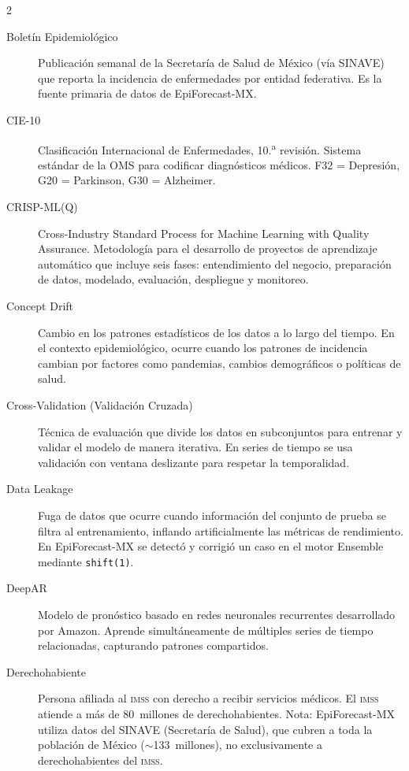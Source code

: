 \documentclass[12pt, letterpaper]{article}
\newcommand{\imss}{\textnormal{\textsc{imss}}}
\begin{document}
\begin{multicols}{2}
\small
\setlength{\emergencystretch}{3em}
\begin{description}

\item[Boletín Epidemiológico]
Publicación semanal de la Secretaría de Salud de México (vía SINAVE) que reporta la incidencia de enfermedades por entidad federativa. Es la fuente primaria de datos de EpiForecast-MX.

\item[CIE-10]
Clasificación Internacional de Enfermedades, 10.\textsuperscript{a} revisión. Sistema estándar de la OMS para codificar diagnósticos médicos. F32 = Depresión, G20 = Parkinson, G30 = Alzheimer.

\item[CRISP-ML(Q)]
Cross-Industry Standard Process for Machine Learning with Quality Assurance. Metodología para el desarrollo de proyectos de aprendizaje automático que incluye seis fases: entendimiento del negocio, preparación de datos, modelado, evaluación, despliegue y monitoreo.

\item[Concept Drift]
Cambio en los patrones estadísticos de los datos a lo largo del tiempo. En el contexto epidemiológico, ocurre cuando los patrones de incidencia cambian por factores como pandemias, cambios demográficos o políticas de salud.

\item[Cross-Validation (Validación Cruzada)]
Técnica de evaluación que divide los datos en subconjuntos para entrenar y validar el modelo de manera iterativa. En series de tiempo se usa validación con ventana deslizante para respetar la temporalidad.

\item[Data Leakage]
Fuga de datos que ocurre cuando información del conjunto de prueba se filtra al entrenamiento, inflando artificialmente las métricas de rendimiento. En EpiForecast-MX se detectó y corrigió un caso en el motor Ensemble mediante \texttt{shift(1)}.

\item[DeepAR]
Modelo de pronóstico basado en redes neuronales recurrentes desarrollado por Amazon. Aprende simultáneamente de múltiples series de tiempo relacionadas, capturando patrones compartidos.

\item[Derechohabiente]
Persona afiliada al \imss{} con derecho a recibir servicios médicos. El \imss{} atiende a más de 80~millones de derechohabientes. Nota: EpiForecast-MX utiliza datos del SINAVE (Secretaría de Salud), que cubren a toda la población de México ($\sim$133~millones), no exclusivamente a derechohabientes del \imss{}.


\end{description}
\end{multicols}
\end{document}

